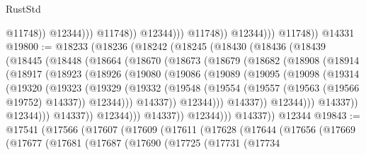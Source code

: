 \begin{lexlean}{RustStd}
\begin{coremodule}
                                      @11748))
                                  @12344)))
                            @11748))
                        @12344)))
                  @11748))
              @12344)))
        @11748))
    @14331
@19800 := @18233
    (@18236
      (@18242
        (@18245
          (@18430
            (@18436
              (@18439
                (@18445
                  (@18448
                    (@18664
                      (@18670
                        (@18673
                          (@18679
                            (@18682
                              (@18908
                                (@18914
                                  (@18917
                                    (@18923
                                      (@18926
                                        (@19080
                                          (@19086
                                            (@19089
                                              (@19095
                                                (@19098
                                                  (@19314
                                                    (@19320
                                                      (@19323
                                                        (@19329
                                                          (@19332
                                                            (@19548
                                                              (@19554
                                                                (@19557
                                                                  (@19563 (@19566 @19752) @14337))
                                                                @12344)))
                                                          @14337))
                                                      @12344)))
                                                @14337))
                                            @12344)))
                                      @14337))
                                  @12344)))
                            @14337))
                        @12344)))
                  @14337))
              @12344)))
        @14337))
    @12344
@19843 := @17541
    (@17566
      (@17607
        (@17609
          (@17611
            (@17628
              (@17644
                (@17656
                  (@17669
                    (@17677
                      (@17681
                        (@17687
                          (@17690
                            (@17725
                              (@17731
                                (@17734

\end{coremodule}
\end{lexlean}

